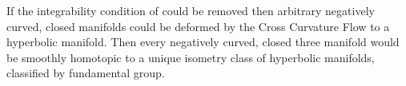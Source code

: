 \documentclass[a4paper,12pt]{amsart}
\begin{document}
If the integrability condition of  could be removed then arbitrary negatively curved, closed manifolds could be deformed by the Cross Curvature Flow to a hyperbolic manifold. Then every negatively curved, closed three manifold would be smoothly homotopic to a unique isometry class of hyperbolic manifolds, classified by fundamental group.

%
%
%
%
\end{document}
